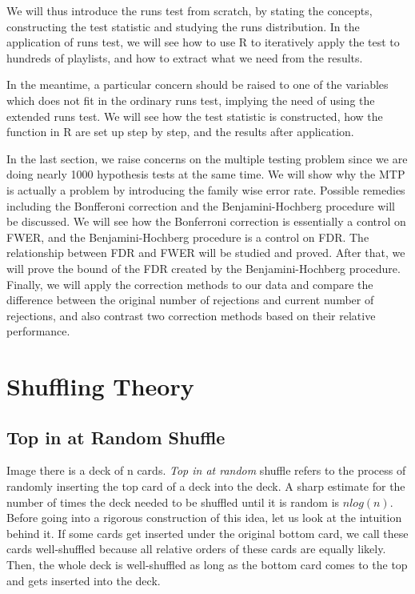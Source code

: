 \documentclass[12pt]{article}
\theoremstyle{plain}
\theoremstyle{definition}
\theoremstyle{remark}
\begin{document}
We will thus introduce the runs test from scratch, by stating the concepts, constructing the test statistic and studying the runs distribution. In the application of runs test, we will see how to use R to iteratively apply the test to hundreds of playlists, and how to extract what we need from the results.

In the meantime, a particular concern should be raised to one of the variables which does not fit in the ordinary runs test, implying the need of using the extended runs test. We will see how the test statistic is constructed, how the function in R are set up step by step, and the results after application.

In the last section, we raise concerns on the multiple testing problem since we are doing nearly 1000 hypothesis tests at the same time. We will show why the MTP is actually a problem by introducing the family wise error rate. Possible remedies including the Bonfferoni correction and the Benjamini-Hochberg procedure will be discussed. We will see how the Bonferroni correction is essentially a control on FWER, and the Benjamini-Hochberg procedure is a control on FDR. The relationship between FDR and FWER will be studied and proved. After that, we will prove the bound of the FDR created by the Benjamini-Hochberg procedure. Finally, we will apply the correction methods to our data and compare the difference between the original number of rejections and current number of rejections, and also contrast two correction methods based on their relative performance.
\clearpage
\section{Shuffling Theory}
\subsection{Top in at Random Shuffle}

Image there is a deck of n cards. \textit{Top in at random}\cite[Example~1 on \pno~333]{1.1} shuffle refers to the process of randomly inserting the top card of a deck into the deck. A sharp estimate for the number of times the deck needed to be shuffled until it is random is $nlog(n)$. Before going into a rigorous construction of this idea, let us look at the intuition behind it. If some cards get inserted under the original bottom card, we call these cards well-shuffled because all relative orders of these cards are equally likely. Then, the whole deck is well-shuffled as long as the bottom card comes to the top and gets inserted into the deck. 
\end{document}
